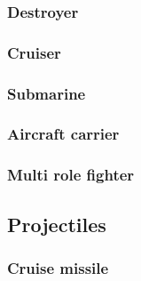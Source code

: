 \documentclass{article}[10pt]
\begin{document}
\subsubsection{Destroyer}
\paragraph{}

\subsubsection{Cruiser}
\paragraph{}

\subsubsection{Submarine}
\paragraph{}

\subsubsection{Aircraft carrier}
\paragraph{}

\subsubsection{Multi role fighter}
\paragraph{}

\subsection{Projectiles}
\subsubsection{Cruise missile}
\paragraph{}
\end{document}
